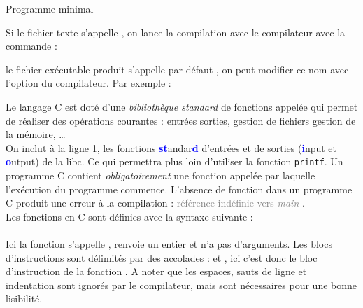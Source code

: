 \documentclass[10pt]{beamer}
\begin{document}
\begin{frame}[fragile]{\Ctitle}{\stitle}
	\begin{exampleblock}{Programme minimal}
		\begin{overprint}
			\medskip
			Si le fichier texte s'appelle , on lance la compilation avec le compilateur  avec la commande :
			\begin{mdframed}[backgroundcolor=codebg] \end{mdframed}
			le fichier exécutable produit s'appelle par défaut , on peut modifier ce nom avec l'option  du compilateur. Par exemple :
			\begin{mdframed}[backgroundcolor=codebg]   \end{mdframed}
			\medskip
			Le langage C est doté d'une \textit{bibliothèque standard} de fonctions appelée  qui permet de réaliser des opérations courantes : entrées sorties, gestion de fichiers gestion de la mémoire, \dots \\
			On inclut à la ligne 1, les fonctions \textcolor{blue}{\textbf{st}}andar\textcolor{blue}{\textbf d} d'entrées et de sorties (\textcolor{blue}{\textbf i}nput et \textcolor{blue}{\textbf o}utput)  de la libc. Ce qui permettra plus loin d'utiliser la fonction \texttt{printf}.
			\onslide<3>
			\medskip
			Un programme C contient \textit{obligatoirement} une fonction appelée  par laquelle l'exécution du programme commence. L'absence de fonction  dans un programme C produit une erreur à la compilation : \og{} \textcolor{gray}{référence indéfinie vers \textit{main}} \fg{}. \\
			Les fonctions en C sont définies avec la syntaxe suivante :\\   \\
			Ici la fonction s'appelle , renvoie un entier  et n'a pas d'arguments.
			\onslide<4>
			\medskip
			Les blocs d'instructions sont délimités par des accolades : \kw{\{} et \kw{\}}, ici c'est donc le bloc d'instruction de la fonction . A noter que les espaces, sauts de ligne et indentation sont ignorés par le compilateur, mais sont nécessaires pour une bonne lisibilité.

\end{overprint}
\end{exampleblock}
\end{frame}
\end{document}
